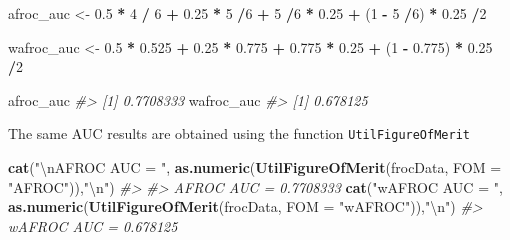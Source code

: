 \documentclass[
]{book}
\newenvironment{Shaded}{\begin{snugshade}}{\end{snugshade}}
\newcommand{\CharTok}[1]{\textcolor[rgb]{0.31,0.60,0.02}{#1}}
\newcommand{\CommentTok}[1]{\textcolor[rgb]{0.56,0.35,0.01}{\textit{#1}}}
\newcommand{\DataTypeTok}[1]{\textcolor[rgb]{0.13,0.29,0.53}{#1}}
\newcommand{\DecValTok}[1]{\textcolor[rgb]{0.00,0.00,0.81}{#1}}
\newcommand{\FloatTok}[1]{\textcolor[rgb]{0.00,0.00,0.81}{#1}}
\newcommand{\KeywordTok}[1]{\textcolor[rgb]{0.13,0.29,0.53}{\textbf{#1}}}
\newcommand{\NormalTok}[1]{#1}
\newcommand{\OperatorTok}[1]{\textcolor[rgb]{0.81,0.36,0.00}{\textbf{#1}}}
\newcommand{\StringTok}[1]{\textcolor[rgb]{0.31,0.60,0.02}{#1}}
\begin{document}
\begin{Shaded}
\begin{Highlighting}[]
\NormalTok{afroc_auc <-}\StringTok{ }\FloatTok{0.5} \OperatorTok{*}\StringTok{ }\DecValTok{4} \OperatorTok{/}\StringTok{ }\DecValTok{6} \OperatorTok{+}\StringTok{ }\FloatTok{0.25} \OperatorTok{*}\StringTok{ }\DecValTok{5} \OperatorTok{/}\DecValTok{6} \OperatorTok{+}\StringTok{ }
\StringTok{ }\DecValTok{5} \OperatorTok{/}\DecValTok{6} \OperatorTok{*}\StringTok{ }\FloatTok{0.25} \OperatorTok{+}\StringTok{  }\NormalTok{(}\DecValTok{1} \OperatorTok{-}\StringTok{ }\DecValTok{5} \OperatorTok{/}\DecValTok{6}\NormalTok{) }\OperatorTok{*}\StringTok{ }\FloatTok{0.25} \OperatorTok{/}\DecValTok{2}

\NormalTok{wafroc_auc <-}\StringTok{ }\FloatTok{0.5} \OperatorTok{*}\StringTok{ }\FloatTok{0.525} \OperatorTok{+}\StringTok{ }\FloatTok{0.25} \OperatorTok{*}\StringTok{ }\FloatTok{0.775} \OperatorTok{+}\StringTok{ }
\StringTok{  }\FloatTok{0.775} \OperatorTok{*}\StringTok{ }\FloatTok{0.25} \OperatorTok{+}\StringTok{  }\NormalTok{(}\DecValTok{1} \OperatorTok{-}\StringTok{ }\FloatTok{0.775}\NormalTok{) }\OperatorTok{*}\StringTok{ }\FloatTok{0.25} \OperatorTok{/}\DecValTok{2}

\NormalTok{afroc_auc}
\CommentTok{#> [1] 0.7708333}
\NormalTok{wafroc_auc}
\CommentTok{#> [1] 0.678125}
\end{Highlighting}
\end{Shaded}

The same AUC results are obtained using the function \texttt{UtilFigureOfMerit}

\begin{Shaded}
\begin{Highlighting}[]
\KeywordTok{cat}\NormalTok{(}\StringTok{"}\CharTok{\textbackslash{}n}\StringTok{AFROC AUC = "}\NormalTok{, }\KeywordTok{as.numeric}\NormalTok{(}\KeywordTok{UtilFigureOfMerit}\NormalTok{(frocData, }\DataTypeTok{FOM =} \StringTok{"AFROC"}\NormalTok{)),}\StringTok{"}\CharTok{\textbackslash{}n}\StringTok{"}\NormalTok{)}
\CommentTok{#> }
\CommentTok{#> AFROC AUC =  0.7708333}
\KeywordTok{cat}\NormalTok{(}\StringTok{"wAFROC AUC = "}\NormalTok{, }\KeywordTok{as.numeric}\NormalTok{(}\KeywordTok{UtilFigureOfMerit}\NormalTok{(frocData, }\DataTypeTok{FOM =} \StringTok{"wAFROC"}\NormalTok{)),}\StringTok{"}\CharTok{\textbackslash{}n}\StringTok{"}\NormalTok{)}
\CommentTok{#> wAFROC AUC =  0.678125}
\end{Highlighting}
\end{Shaded}
\end{document}
